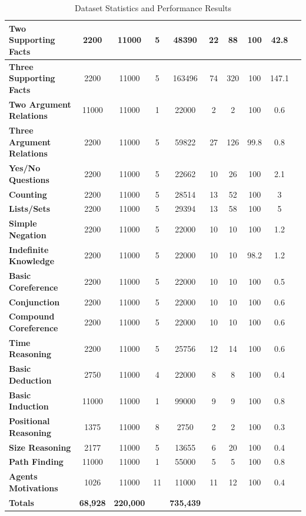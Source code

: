 \documentclass[letterpaper]{article}
\begin{document}
\begin{table}[b]
\begin{tabular}{|l||*{9}{c|}}
\textbf{\cellcolor{green!20}Two Supporting Facts} & 2200 & 11000 &  5 & 48390 & 22 & 88 & 100 & 42.8\\\hline
\textbf{\cellcolor{green!20}Three Supporting Facts} & 2200 & 11000 & 5 & 163496 & 74 & 320 & 100 & 147.1\\\hline
\textbf{\cellcolor{green!20}Two Argument Relations} & 11000 & 11000  & 1 & 22000 & 2 & 2 & 100 & 0.6\\\hline
\textbf{\cellcolor{green!20}Three Argument Relations} & 2200 & 11000 & 5 & 59822 & 27 & 126 & 99.8 & 0.8\\\hline
\textbf{\cellcolor{green!20}Yes/No Questions} & 2200 & 11000 & 5 & 22662 & 10 & 26 & 100 & 2.1\\\hline
\textbf{\cellcolor{green!20}Counting} & 2200 & 11000 & 5 & 28514 & 13 & 52 & 100 & 3\\\hline
\textbf{\cellcolor{green!20}Lists/Sets} & 2200 & 11000 & 5 & 29394 & 13 & 58 & 100 & 5\\\hline
\textbf{\cellcolor{green!20}Simple Negation}  & 2200 & 11000 & 5 & 22000 & 10 & 10 & 100 & 1.2\\\hline
\textbf{\cellcolor{green!20}Indefinite Knowledge} & 2200 & 11000 & 5 & 22000  & 10 & 10 & 98.2 & 1.2\\\hline
\textbf{\cellcolor{green!20}Basic Coreference} & 2200 & 11000 & 5 & 22000 & 10 & 10  & 100 & 0.5\\\hline
\textbf{\cellcolor{green!20}Conjunction} & 2200 & 11000  & 5 & 22000 & 10 & 10 & 100 & 0.6\\\hline
\textbf{\cellcolor{green!20}Compound Coreference} & 2200 & 11000 & 5 & 22000 & 10 & 10 & 100 & 0.6\\\hline
\textbf{\cellcolor{green!20}Time Reasoning} & 2200 & 11000  & 5 & 25756 & 12 & 14 & 100 & 0.6\\\hline
\textbf{\cellcolor{green!20}Basic Deduction} & 2750 & 11000 & 4 & 22000 & 8 & 8 & 100 & 0.4\\\hline
\textbf{\cellcolor{green!20}Basic Induction} & 11000 & 11000 & 1 & 99000 & 9 & 9 & 100 & 0.8\\\hline
\textbf{\cellcolor{green!20}Positional Reasoning} & 1375 & 11000 & 8 & 2750 & 2 & 2 & 100 & 0.3\\\hline
\textbf{\cellcolor{green!20}Size Reasoning} & 2177 & 11000 & 5 & 13655 & 6 & 20 & 100 & 0.4\\\hline
\textbf{\cellcolor{green!20}Path Finding} & 11000 & 11000 & 1 & 55000 & 5 & 5 & 100 & 0.8\\\hline
\textbf{\cellcolor{green!20}Agents Motivations} & 1026 & 11000 & 11 & 11000 & 11 & 12 & 100 & 0.4\\\hline
\textbf{\cellcolor{orange!20}\textbf{Totals}} & \textbf{68,928} & \textbf{220,000} &  & \textbf{735,439} &  &  &  & \\\hline
\end{tabular}
\caption{Dataset Statistics and Performance Results}
\label{table:square_performance_result}
\end{table}
\end{document}
